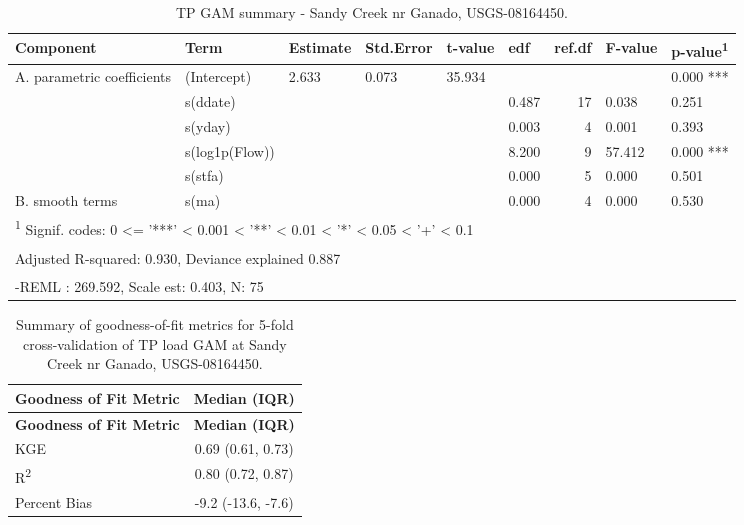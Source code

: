 \documentclass[
]{article}
\newenvironment{widestuff}{\begin{table}[h]\begin{adjustwidth}{-4.5cm}{-4.5cm}\centering}{\end{adjustwidth}\end{table}}
\begin{document}
\begin{widestuff}

\caption{TP GAM summary - Sandy Creek nr Ganado, USGS-08164450.}
\centering
\begin{tabular}[t]{llllllrll}
\toprule
Component & Term & Estimate & Std.Error & t-value & edf & ref.df & F-value & p-value\textsuperscript{1}\\
\midrule
A. parametric coefficients & (Intercept) & 2.633 & 0.073 & 35.934 &  &  &  & 0.000 ***\\
\cmidrule{1-9}
 & s(ddate) &  &  &  & 0.487 & 17 & 0.038 & 0.251\\

 & s(yday) &  &  &  & 0.003 & 4 & 0.001 & 0.393\\

 & s(log1p(Flow)) &  &  &  & 8.200 & 9 & 57.412 & 0.000 ***\\

 & s(stfa) &  &  &  & 0.000 & 5 & 0.000 & 0.501\\

\multirow[t]{-5}{*}{\raggedright\arraybackslash B. smooth terms} & s(ma) &  &  &  & 0.000 & 4 & 0.000 & 0.530\\
\bottomrule
\multicolumn{9}{l}{\textsuperscript{1} Signif. codes: 0 <= '***' < 0.001 < '**' < 0.01 < '*' < 0.05 < '+' < 0.1}\\
\multicolumn{9}{l}{\textsuperscript{} Adjusted R-squared: 0.930, Deviance explained 0.887}\\
\multicolumn{9}{l}{\textsuperscript{} -REML : 269.592, Scale est: 0.403, N: 75}\\
\end{tabular}
\end{widestuff}

\hypertarget{tbl-TP08164450-CV}{}
\begin{longtable}[]{@{}lc@{}}
\caption{\label{tbl-TP08164450-CV}Summary of goodness-of-fit metrics for
5-fold cross-validation of TP load GAM at Sandy Creek nr Ganado,
USGS-08164450.}\tabularnewline
\toprule()
\textbf{Goodness of Fit Metric} & \textbf{Median (IQR)} \\
\midrule()
\endfirsthead
\toprule()
\textbf{Goodness of Fit Metric} & \textbf{Median (IQR)} \\
\midrule()
\endhead
KGE & 0.69 (0.61, 0.73) \\
R\textsuperscript{2} & 0.80 (0.72, 0.87) \\
Percent Bias & -9.2 (-13.6, -7.6) \\
\bottomrule()
\end{longtable}
\end{document}
